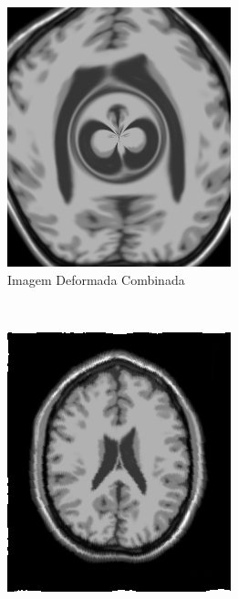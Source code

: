 \documentclass[]{spie}  %
\begin{document}
\begin{figure}[h]
\begin{subfigure}[t]{0.16\textwidth}
	  \includegraphics[width=\textwidth]{../images/movingImageSinDist.png}
	  \caption{Imagem Deformada Combinada}
	  \label{fig:sindist-image} 
	\end{subfigure} \\
	\begin{subfigure}[t]{0.16\textwidth}
	  \includegraphics[width=\textwidth]{../images/resultSin.png}

\end{subfigure}
\end{figure}
\end{document}
